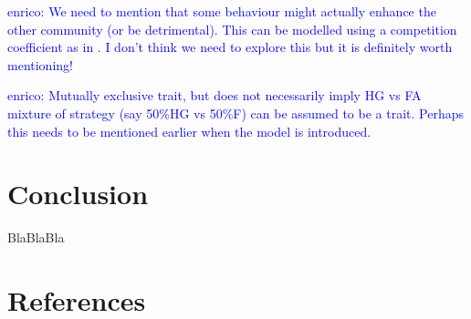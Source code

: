 \documentclass[preprint,authoryear]{elsarticle}
\newcommand{\memo}[2]{\textcolor{#1}{#2}}
\newcommand{\enrico}[1]{\memo{blue}{enrico: #1\\}}
\begin{document}
\enrico{We need to mention that some behaviour might actually enhance the other community (or be detrimental). This can be modelled using a competition coefficient as in \citep{jang2013}. I don't think we need to explore this but it is definitely worth mentioning!}

\enrico{Mutually exclusive trait, but does not necessarily imply HG vs FA mixture of strategy (say 50\%HG vs 50\%F) can be assumed to be a trait. Perhaps this needs to be mentioned earlier when the model is introduced.}

\section{Conclusion}

BlaBlaBla

\section{References}



\end{document}
